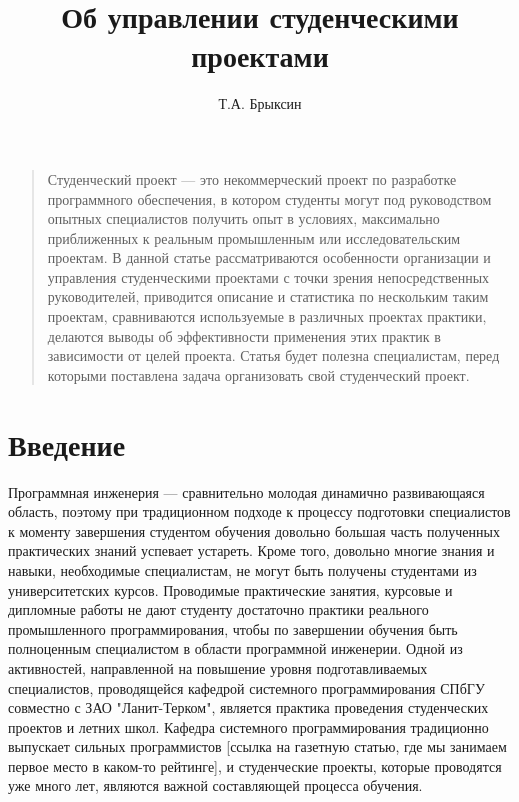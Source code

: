 \documentclass[a5paper]{article}
\title{Об управлении студенческими проектами}
\author{Т.А. Брыксин}
\date{}
\begin{document}
\maketitle
\thispagestyle{empty}


\begin{quote}
\small\noindent
Студенческий проект --- это некоммерческий проект по разработке программного обеспечения, в котором студенты могут под руководством опытных специалистов получить опыт в условиях, максимально приближенных к реальным промышленным или исследовательским проектам. В данной статье рассматриваются особенности организации и управления студенческими проектами с точки зрения непосредственных руководителей, приводится описание и статистика по нескольким таким проектам, сравниваются  используемые в различных проектах практики, делаются выводы об эффективности применения этих практик в зависимости от целей проекта. Статья будет полезна специалистам, перед которыми поставлена задача организовать свой студенческий проект.
\end{quote}

\section*{Введение}
Программная инженерия --- сравнительно молодая динамично развивающаяся область, поэтому при традиционном подходе к процессу подготовки специалистов к моменту завершения студентом обучения довольно большая часть полученных практических знаний успевает устареть. Кроме того, довольно многие знания и навыки, необходимые специалистам, не могут быть получены студентами из университетских курсов. Проводимые практические занятия, курсовые и дипломные работы не дают студенту достаточно практики реального  промышленного программирования, чтобы по завершении обучения быть полноценным специалистом в области программной инженерии. Одной из активностей, направленной на повышение уровня подготавливаемых специалистов, проводящейся кафедрой системного программирования СПбГУ совместно с ЗАО "Ланит-Терком", является практика проведения студенческих проектов и летних школ. Кафедра системного программирования традиционно выпускает сильных программистов [ссылка на газетную статью, где мы занимаем первое место в каком-то рейтинге], и студенческие проекты, которые проводятся уже много лет, являются важной составляющей процесса обучения.
\end{document}

